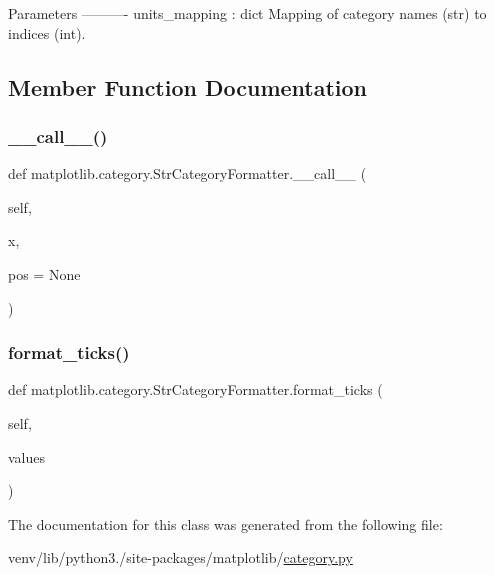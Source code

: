 \begin{DoxyVerb}Parameters
----------
units_mapping : dict
    Mapping of category names (str) to indices (int).
\end{DoxyVerb}
 

\subsection{Member Function Documentation}
\mbox{\label{classmatplotlib_1_1category_1_1StrCategoryFormatter_a0cc9465fa4724e565c026dd14c8c125d}} 
\subsubsection{\texorpdfstring{\+\_\+\+\_\+call\+\_\+\+\_\+()}{\_\_call\_\_()}}
{\footnotesize\ttfamily def matplotlib.\+category.\+Str\+Category\+Formatter.\+\_\+\+\_\+call\+\_\+\+\_\+ (\begin{DoxyParamCaption}\item[{}]{self,  }\item[{}]{x,  }\item[{}]{pos = {\ttfamily None} }\end{DoxyParamCaption})}

\mbox{\label{classmatplotlib_1_1category_1_1StrCategoryFormatter_a3d4c60f107c0b3afa66d02de58606b65}} 
\subsubsection{\texorpdfstring{format\+\_\+ticks()}{format\_ticks()}}
{\footnotesize\ttfamily def matplotlib.\+category.\+Str\+Category\+Formatter.\+format\+\_\+ticks (\begin{DoxyParamCaption}\item[{}]{self,  }\item[{}]{values }\end{DoxyParamCaption})}



The documentation for this class was generated from the following file\+:\begin{DoxyCompactItemize}
\item 
venv/lib/python3./site-\/packages/matplotlib/\hyperlink{category_8py}{category.\+py}\end{DoxyCompactItemize}
